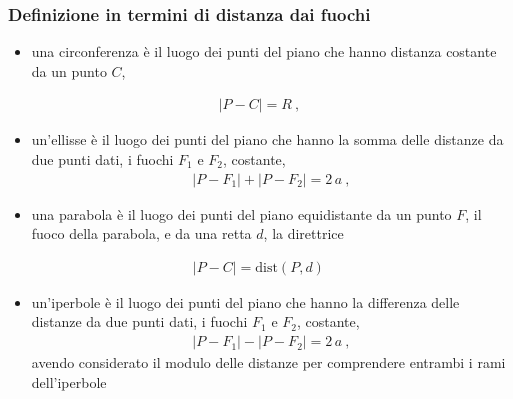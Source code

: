 \documentclass[letterpaper,10pt,italian]{jupyterBook}
\begin{document}
\subsubsection*{Definizione in termini di distanza dai fuochi}
\begin{itemize}
\item {} 
\sphinxAtStartPar
una circonferenza è il luogo dei punti del piano che hanno distanza costante da un punto \(C\),

\end{itemize}
\begin{equation*}
\begin{split}|P - C| = R \ ,\end{split}
\end{equation*}\begin{itemize}
\item {} 
\sphinxAtStartPar
un’ellisse è il luogo dei punti del piano che hanno la somma delle distanze da due punti dati, i fuochi \(F_1\) e \(F_2\), costante,
\begin{equation*}
\begin{split}|P-F_1| + |P-F_2| = 2 \, a \ ,\end{split}
\end{equation*}
\item {} 
\sphinxAtStartPar
una parabola è il luogo dei punti del piano equidistante da un punto \(F\), il fuoco della parabola, e da una retta \(d\), la direttrice

\end{itemize}
\begin{equation*}
\begin{split}|P - C| = \text{dist}(P,d) \, \end{split}
\end{equation*}\begin{itemize}
\item {} 
\sphinxAtStartPar
un’iperbole è il luogo dei punti del piano che hanno la differenza delle distanze da due punti dati, i fuochi \(F_1\) e \(F_2\), costante,
\begin{equation*}
\begin{split}|P-F_1| - |P-F_2| = 2 \, a \ ,\end{split}
\end{equation*}
\sphinxAtStartPar
avendo considerato il modulo delle distanze per comprendere entrambi i rami dell’iperbole

\end{itemize}
\end{document}

